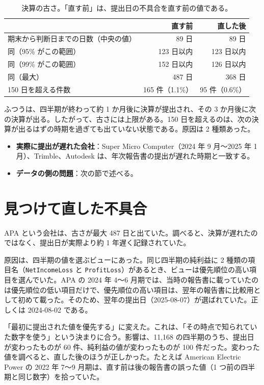 \documentclass[xelatex,ja=standard,jafont=hiragino-pron,a4paper,10pt]{bxjsreport}
\newcommand{\code}[1]{\texttt{#1}}
\begin{document}
\begin{table}[htbp]
\centering
\caption{決算の古さ。「直す前」は、提出日の不具合を直す前の値である。}
\small
\begin{tabular}{lrr}
\toprule
 & 直す前 & 直した後 \\
\midrule
期末から判断日までの日数（中央の値） & 89 日 & 89 日 \\
同（95\% がこの範囲） & 123 日以内 & 123 日以内 \\
同（99\% がこの範囲） & 152 日以内 & 126 日以内 \\
同（最大） & 487 日 & 368 日 \\
150 日を超える件数 & 165 件（1.1\%） & 95 件（0.6\%） \\
\bottomrule
\end{tabular}
\end{table}

ふつうは、四半期が終わって約 1 か月後に決算が提出され、その 3 か月後に次の決算が出る。したがって、古さには上限がある。150 日を超えるのは、次の決算が出るはずの時期を過ぎても出ていない状態である。原因は 2 種類あった。

\begin{itemize}
\item \textbf{実際に提出が遅れた会社}：Super Micro Computer（2024 年 9 月〜2025 年 1 月）、Trimble、Autodesk は、年次報告書の提出が遅れた時期と一致する。
\item \textbf{データの側の問題}：次の節で述べる。
\end{itemize}

\section{見つけて直した不具合}

APA という会社は、古さが最大 487 日と出ていた。調べると、決算が遅れたのではなく、提出日が実際より約 1 年遅く記録されていた。

原因は、四半期の値を選ぶビューにあった。同じ四半期の純利益に 2 種類の項目名（\code{NetIncomeLoss} と \code{ProfitLoss}）があるとき、ビューは優先順位の高い項目を選んでいた。APA の 2024 年 4〜6 月期では、当時の報告書に載っていたのは優先順位の低い項目だけで、優先順位の高い項目は、翌年の報告書に比較用として初めて載った。そのため、翌年の提出日（2025-08-07）が選ばれていた。正しくは 2024-08-02 である。

「最初に提出された値を優先する」に変えた。これは、「その時点で知られていた数字を使う」という決まりに合う。影響は、11,168 の四半期のうち、提出日が変わったものが 60 件、純利益の値が変わったものが 100 件だった。変わった値を調べると、直した後のほうが正しかった。たとえば American Electric Power の 2022 年 7〜9 月期は、直す前は後の報告書の誤った値（1 つ前の四半期と同じ数字）を拾っていた。
\end{document}
